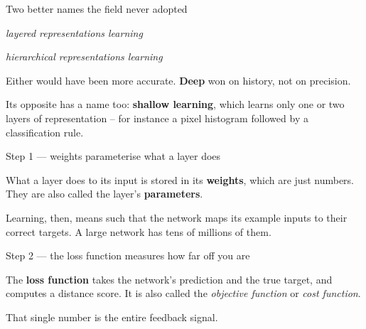 \documentclass[aspectratio=169,11pt,t]{beamer}
\begin{document}
\begin{frame}[shrink=25]{Two better names the field never adopted}
\begin{minipage}[t]{0.485\textwidth}
\begin{ibullets}
\item \textit{layered representations learning}
\item \textit{hierarchical representations learning}
\end{ibullets}
{\fontsize{9.4}{12.6}\selectfont\color{fg2}Either would have been more accurate. \textbf{Deep} won on history, not on precision.\par}\vskip 4pt

\end{minipage}%
\hfill
\begin{minipage}[t]{0.485\textwidth}
\begin{iband}[amber]
Its opposite has a name too: \textbf{shallow learning}, which learns only one or two layers of representation -- for instance a pixel histogram followed by a classification rule.
\end{iband}

\end{minipage}%
\end{frame}


\begin{frame}[shrink=25]{Step 1 --- weights parameterise what a layer does}
{\fontsize{9.4}{12.6}\selectfont\color{fg2}What a layer does to its input is stored in its \textbf{weights}, which are just numbers. They are also called the layer's \textbf{parameters}.\par}\vskip 4pt
\begin{iband}[signal]
Learning, then, means  such that the network maps its example inputs to their correct targets. A large network has tens of millions of them.
\end{iband}
\end{frame}

\begin{frame}[shrink=25]{Step 2 --- the loss function measures how far off you are}
{\fontsize{9.4}{12.6}\selectfont\color{fg2}The \textbf{loss function} takes the network's prediction and the true target, and computes a distance score. It is also called the \textit{objective function} or \textit{cost function}.\par}\vskip 4pt
\begin{iband}[signal]
That single number is the entire feedback signal. 
\end{iband}
\end{frame}
\end{document}

